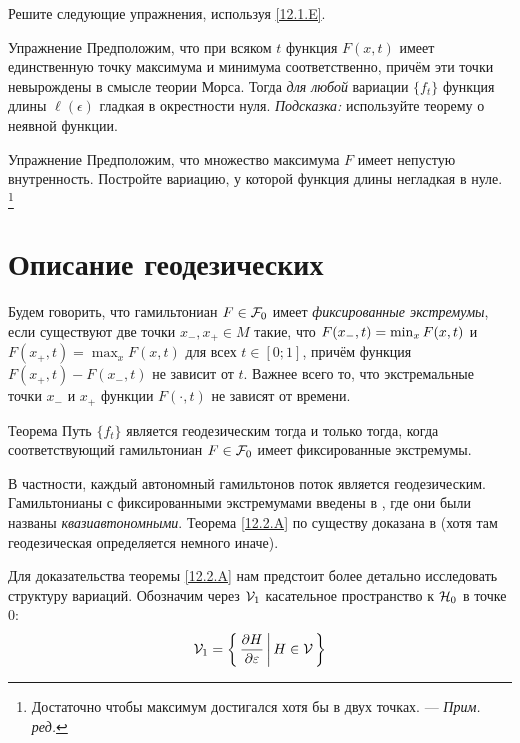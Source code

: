 Решите следующие упражнения, используя \ref{12.1.E}.

\begin{ex}{Упражнение}\label{12.1.F}
Предположим, что при всяком $t$ функция $F(x, t)$ имеет единственную
точку максимума и минимума соответственно, причём эти точки
невырождены в смысле теории Морса. 
Тогда \textit{для любой} вариации $\{f_t\}$ функция длины $\ell(\epsilon)$ гладкая в окрестности нуля. 
\emph{Подсказка:} используйте теорему о неявной функции.
\end{ex}

\begin{ex}{Упражнение}\label{12.1.G}
Предположим, что множество максимума $F$ имеет непустую внутренность.
Постройте вариацию, у которой функция длины негладкая в нуле.%
\footnote{Достаточно чтобы максимум достигался хотя бы в двух точках. — \textit{Прим. ред.}}
\end{ex}

\section{Описание геодезических}\label{sec:12.2}

Будем говорить, что гамильтониан $F\in \mathcal{F}_0$ имеет \emph{фиксированные экстремумы}, если существуют две точки $x_-, x_+\in M$ такие, что $F(x_-, t) \z= \min_x F(x, t)$ и $F(x_+, t) = \max_x F (x, t)$ для всех $t\in[0; 1]$, причём функция $F(x_+, t) - F(x_-, t)$ не зависит от $t$.
Важнее всего то, что экстремальные точки $x_-$ и $x_+$ функции $F(\cdot, t)$ не зависят от времени.

\begin{thm}{Теорема}\label{12.2.A}
Путь $\{f_t\}$ является геодезическим тогда и только тогда, когда соответствующий гамильтониан $F\in\mathcal{F}_0$ имеет фиксированные экстремумы.
\end{thm}

В частности, каждый автономный гамильтонов поток является геодезическим.
Гамильтонианы с фиксированными экстремумами введены в \cite{BP1}, где они были названы \emph{квазиавтономными}.
Теорема \ref{12.2.A} по существу доказана в \cite{LM2} (хотя там геодезическая определяется немного иначе).

Для доказательства теоремы \ref{12.2.A} нам предстоит более детально исследовать структуру вариаций.
Обозначим через $\mathcal{V}_1$ касательное пространство к $\mathcal{H}_0$ в точке $0$: 
\[\mathcal{V}_1=\left\{ \,{\frac{\partial H}{\partial\varepsilon}}\, \middle| \,{H\in \mathcal{V}}\, \right\}\]

